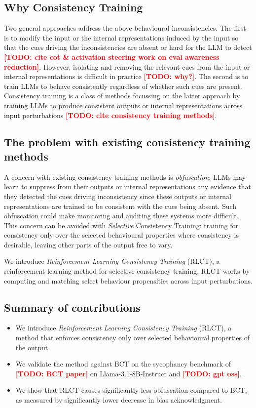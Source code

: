\documentclass{article}
\newcommand{\todo}[1]{\textcolor{red}{\textbf{[TODO: #1]}}}
\begin{document}
\subsection{Why Consistency Training}
Two general approaches address the above behavioural inconsistencies. The first is to modify the input or the internal representations induced by the input so that the cues driving the inconsistencies are absent or hard for the LLM to detect \todo{cite cot \& activation steering work on eval awareness reduction}. However, isolating and removing the relevant cues from the input or internal representations is difficult in practice \todo{why?}. The second is to train LLMs to behave consistently regardless of whether such cues are present. Consistency training is a class of methods focussing on the latter approach by training LLMs to produce consistent outputs or internal representations across input perturbations \todo{cite consistency training methods}.

\subsection{The problem with existing consistency training methods}

A concern with existing consistency training methods is
\emph{obfuscation}: LLMs may learn to suppress from their outputs or internal representations any evidence that they detected the cues driving inconsistency since these outputs or internal representations are trained to be consistent with the cues being absent. Such obfuscation could make monitoring and auditing these systems more difficult. This concern can be avoided with \emph{Selective} Consistency Training: training for consistency only over the selected behavioural properties where consistency is desirable, leaving other parts of the output free to vary. 

We introduce \emph{Reinforcement Learning Consistency Training}
(RLCT), a reinforcement learning method for selective consistency training. RLCT works by computing and matching select behaviour propensities across input perturbations. 


\subsection{Summary of contributions}
\begin{itemize}
    \item We introduce \emph{Reinforcement Learning Consistency Training}
    (RLCT), a method that enforces consistency only over selected
    behavioural properties of the output. 
    \item We validate the method against BCT on the sycophancy benchmark of
    \todo{BCT paper} on Llama-3.1-8B-Instruct and \todo{gpt oss}.
    \item We show that RLCT causes significantly less obfuscation compared to BCT, as measured by significantly lower decrease in bias acknowledgment. 
\end{itemize}
\end{document}
